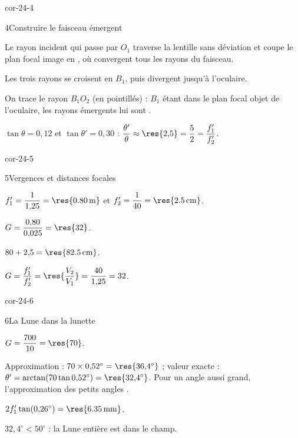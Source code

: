 \begin{blocLivre}{cor-24-4}
\begin{corrige}{4}{Construire le faisceau émergent}
\begin{questions}
\item Le rayon incident qui passe par $O_1$ traverse la lentille sans déviation et coupe le plan focal image en
, où convergent tous les rayons du faisceau.
\item Les trois rayons se croisent en $B_1$, puis divergent jusqu'à l'oculaire.
\item On trace le rayon $B_1O_2$ (en pointillés) : $B_1$ étant dans le plan focal objet de l'oculaire, les rayons émergents
lui sont .
\item $\tan\theta=0{,}12$ et $\tan\theta'=0{,}30$ : $\dfrac{\theta'}{\theta}\approx\res{2{,}5}=\dfrac{5}{2}=\dfrac{f'_1}{f'_2}$.
\end{questions}
\end{corrige}
\end{blocLivre}
\begin{blocLivre}{cor-24-5}
\begin{corrige}{5}{Vergences et distances focales}
\begin{questions}
\item $f'_1=\dfrac{1}{1{,}25}=\res{\qty{0,80}{m}}$ et $f'_2=\dfrac{1}{40}=\res{\qty{2,5}{cm}}$.
\item $G=\dfrac{0{,}80}{0{,}025}=\res{32}$.
\item $80+2{,}5=\res{\qty{82,5}{cm}}$.
\item $G=\dfrac{f'_1}{f'_2}=\res{\dfrac{V_2}{V_1}}=\dfrac{40}{1{,}25}=32$.
\end{questions}
\end{corrige}
\end{blocLivre}
\begin{blocLivre}{cor-24-6}
\begin{corrige}{6}{La Lune dans la lunette}
\begin{questions}
\item $G=\dfrac{700}{10}=\res{70}$.
\item Approximation : $70\times0{,}52^\circ=\res{36{,}4^\circ}$ ; valeur exacte : $\theta'=\arctan(70\tan0{,}52^\circ)=\res{32{,}4^\circ}$. Pour un
angle aussi grand, l'approximation des petits angles .
\item $2f'_1\tan(0{,}26^\circ)=\res{\qty{6,35}{mm}}$.
\item $32{,}4^\circ<50^\circ$ : la Lune entière est  dans le champ.
\end{questions}
\end{corrige}
\end{blocLivre}
